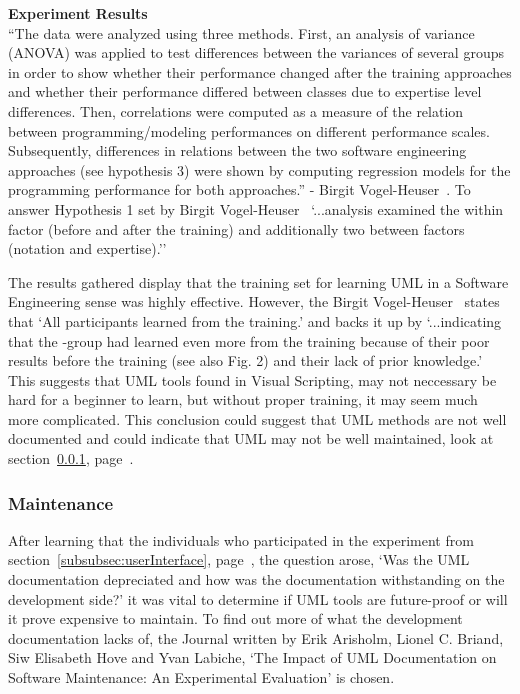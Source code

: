 \documentclass[conference]{IEEEtran}
\begin{document}
          \textbf{Experiment Results}\\
            ``The data were analyzed using three methods. First, an analysis of variance (ANOVA) was applied to test differences between the variances of several groups in order to show whether their performance changed after the training approaches and whether their performance differed between classes due to expertise level differences. Then, correlations were computed as a measure of the relation between programming/modeling performances on different performance scales. Subsequently, differences in relations between the two software engineering approaches (see hypothesis 3) were shown by computing regression models for the programming performance for both approaches.'' - Birgit Vogel-Heuser~\cite{vogel-heuser_evaluation_2013}. To answer Hypothesis 1 set by Birgit Vogel-Heuser~\cite{vogel-heuser_evaluation_2013} `...analysis examined the within factor (before and after the training) and additionally two between factors (notation and expertise).''

            The results gathered display that the training set for learning UML in a Software Engineering sense was highly effective. However, the Birgit Vogel-Heuser~\cite{vogel-heuser_evaluation_2013} states that `All participants learned from the training.' and backs it up by `...indicating that the -group had learned even more from the training because of their poor results before the training (see also Fig. 2) and their lack of prior knowledge.' This suggests that UML tools found in Visual Scripting, may not neccessary be hard for a beginner to learn, but without proper training, it may seem much more complicated. This conclusion could suggest that UML methods are not well documented and could indicate that UML may not be well maintained, look at section~\ref{subsubsec:maintenance}, page~\pageref{subsubsec:maintenance}.

        \subsubsection{Maintenance}
        \label{subsubsec:maintenance}
          After learning that the individuals who participated in the experiment from section~\ref{subsubsec:userInterface}, page~\pageref{subsubsec:userInterface}, the question arose, `Was the UML documentation depreciated and how was the documentation withstanding on the development side?' it was vital to determine if UML tools are future-proof or will it prove expensive to maintain. To find out more of what the development documentation lacks of, the Journal written by Erik Arisholm, Lionel C. Briand, Siw Elisabeth Hove and Yvan Labiche, `The Impact of UML Documentation on Software Maintenance: An Experimental Evaluation' is chosen.
\end{document}

